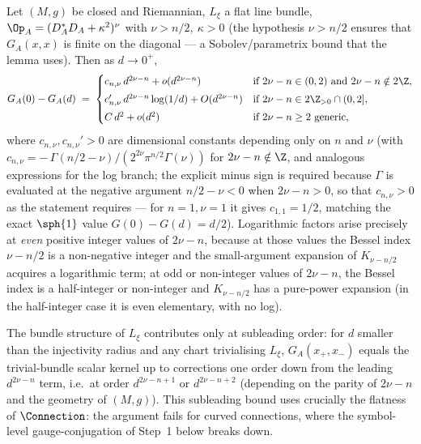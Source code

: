 \begin{lemma}
\label{lem:kernel-asymptotic}
Let $(M,g)$ be closed and Riemannian, $L_\xi$ a flat line bundle,
$\Op_A=(D_A^*D_A+\kappa^2)^\nu$ with $\nu>n/2,\ \kappa>0$
(the hypothesis $\nu>n/2$ ensures that $G_A(x,x)$ is finite on the
diagonal --- a Sobolev/parametrix bound that the lemma uses). Then
as $d\to 0^+$,
\[
   G_A(0)-G_A(d) \;=\;
   \begin{cases}
      c_{n,\nu}\,d^{2\nu-n} + o(d^{2\nu-n})
      & \text{if } 2\nu-n\in(0,2)\text{ and }2\nu-n\notin 2\Z, \\[3pt]
      c_{n,\nu}'\,d^{2\nu-n}\log(1/d) + O(d^{2\nu-n})
      & \text{if } 2\nu-n\in 2\Z_{>0}\cap(0,2], \\[3pt]
      C\,d^2 + o(d^2) & \text{if } 2\nu-n\geq 2 \text{ generic,}
   \end{cases}
\]
where $c_{n,\nu}, c_{n,\nu}'>0$ are dimensional constants depending
only on $n$ and $\nu$ (with
$c_{n,\nu}=-\,\Gamma(n/2-\nu)/(2^{2\nu}\pi^{n/2}\Gamma(\nu))$
for $2\nu-n\notin\Z$, and analogous expressions for the log branch;
the explicit minus sign is required because $\Gamma$ is evaluated at
the negative argument $n/2-\nu<0$ when $2\nu-n>0$, so that
$c_{n,\nu}>0$ as the statement requires --- for $n=1,\nu=1$ it gives
$c_{1,1}=1/2$, matching the exact $\sph{1}$ value
$G(0)-G(d)=d/2$).
Logarithmic factors arise precisely at \emph{even} positive integer
values of $2\nu-n$, because at those values the Bessel index
$\nu-n/2$ is a non-negative integer and the small-argument expansion
of $K_{\nu-n/2}$ acquires a logarithmic term; at odd or non-integer
values of $2\nu-n$, the Bessel index is a half-integer or
non-integer and $K_{\nu-n/2}$ has a pure-power expansion (in the
half-integer case it is even elementary, with no log).

The bundle structure of $L_\xi$ contributes only at subleading
order: for $d$ smaller than the injectivity radius and any chart
trivialising $L_\xi$, $G_A(x_+,x_-)$ equals the trivial-bundle
scalar kernel up to corrections one order down from the leading
$d^{2\nu-n}$ term, i.e.\ at order $d^{2\nu-n+1}$ or $d^{2\nu-n+2}$
(depending on the parity of $2\nu-n$ and the geometry of $(M,g)$).
This subleading bound uses crucially the flatness of $\Connection$:
the argument fails for curved connections, where the symbol-level
gauge-conjugation of Step~1 below breaks down.
\end{lemma}

